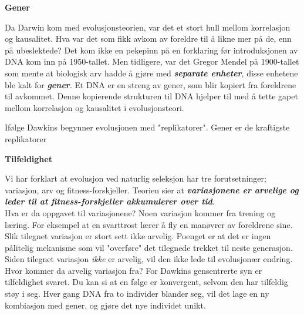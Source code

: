 \documentclass[11pt, a4paper]{article}
\newenvironment{sectionbox}[1][]{%
    \begin{sectionboxinner}
    \textbf{\large #1}
    \vspace{1pt}
    \newline
}{%
    \end{sectionboxinner}
}
\begin{document}
\begin{sectionbox}[Gener]
    \begin{flushleft}
        Da Darwin kom med evolusjonsteorien, var det et stort hull mellom korrelasjon og kausalitet. Hva var det som fikk avkom av foreldre til å likne mer på de, enn på ubeslektede? Det kom ikke en pekepinn på en forklaring før introduksjonen av DNA kom inn på 1950-tallet. Men tidligere, var det Gregor Mendel på 1900-tallet som mente at biologisk arv hadde å gjøre med \textbf{\textit{separate enheter}}, disse enhetene ble kalt for \textbf{\textit{gener}}. Et DNA er en streng av gener, som blir kopiert fra foreldrene til avkommet. Denne kopierende strukturen til DNA hjelper til med å tette gapet mellom korrelasjon og kausalitet i evolusjonsteori.\\
    \end{flushleft}

    \begin{flushleft}
        Ifølge Dawkins begynner evolusjonen med "replikatorer". Gener er de kraftigste replikatorer
    \end{flushleft}
\end{sectionbox}

\begin{sectionbox}[Tilfeldighet]
    \begin{flushleft}
        Vi har forklart at evolusjon ved naturlig seleksjon har tre forutsetninger; variasjon, arv og fitness-forskjeller. Teorien sier at \textbf{\textit{variasjonene er arvelige og leder til at fitness-forskjeller akkumulerer over tid}}. \\

        Hva er da oppgavet til variasjonene? Noen variasjon kommer fra trening og læring. For eksempel at en svarttrost lærer å fly en manøvrer av foreldrene sine. Slik tilegnet variasjon er stort sett ikke arvelig. Poenget er at det er ingen pålitelig mekanisme som vil "overføre" det tilegnede trekket til neste generasjon. Siden tilegnet variasjon \textit{ikke} er arvelig, vil den ikke lede til evolusjonær endring. \\

        Hvor kommer da arvelig variasjon fra? For Dawkins gensentrerte syn er tilfeldighet svaret. Du kan si at en følge er konvergent, selvom den har tilfeldig støy i seg. Hver gang DNA fra to individer blander seg, vil det lage en ny kombiasjon med gener, og gjøre det nye individet unikt.
    \end{flushleft}
\end{sectionbox}
\end{document}
